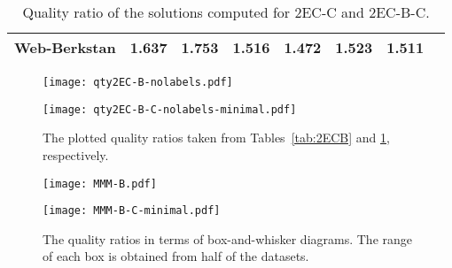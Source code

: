 \documentclass[11pt]{article}
\begin{document}
\begin{table}[!ht]
\begin{adjustbox}{width=\textwidth,totalheight=\textheight,keepaspectratio}
\begin{small}
\begin{tabular}{l|c|cccccc}
Web-Berkstan                        & 1.637                                               & 1.753                                                  & 1.516                                  & 1.472                                  & 1.523                                      & 1.511  \\
	\hline
\end{tabular}  \end{small}
\end{adjustbox}
\caption{Quality ratio  of the solutions computed for \textsf{2EC-C} and \textsf{2EC-B-C}.}\label{tab:2ECBC}
\end{table}



\begin{figure}[!ht]
\centering
\texttt{[image: qty2EC-B-nolabels.pdf]}

\vspace*{0.1in}

\texttt{[image: qty2EC-B-C-nolabels-minimal.pdf]}\caption{The plotted quality ratios taken from Tables~\ref{tab:2ECB} and \ref{tab:2ECBC}, respectively.
\label{fig:plottedquality}}
\end{figure}



\begin{figure}[!ht]
\centering
\texttt{[image: MMM-B.pdf]}

\vspace*{0.1in}

\texttt{[image: MMM-B-C-minimal.pdf]}\caption{The quality ratios in terms of box-and-whisker diagrams. The range of each box is obtained from half of the datasets.
\label{fig:box-quality}}
\end{figure}
\end{document}
